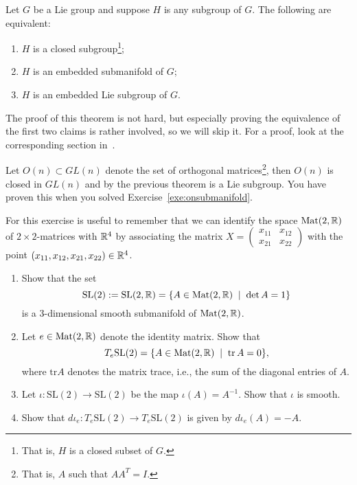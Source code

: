 \begin{theorem}
  Let $G$ be a Lie group and suppose $H$ is any subgroup of $G$.
  The following are equivalent:
  \begin{enumerate}
    \item $H$ is a closed subgroup\footnote{That is, $H$ is a closed subset of $G$.};
    \item $H$ is an embedded submanifold of $G$;
    \item $H$ is an embedded Lie subgroup of $G$.
  \end{enumerate}
\end{theorem}

The proof of this theorem is not hard, but especially proving the equivalence of the first two claims is rather involved, so we will skip it.
For a proof, look at the corresponding section in~\cite[Chapter 20]{book:lee}.

\begin{example}
  Let $O(n)\subset GL(n)$ denote the set of orthogonal matrices\footnote{That is, $A$ such that $AA^T = I$.}, then $O(n)$ is closed in $GL(n)$ and by the previous theorem is a Lie subgroup.
  You have proven this when you solved Exercise~\ref{exe:onsubmanifold}.
\end{example}

\begin{exercise}\label{ex:SL2LGA}
  For this exercise is useful to remember that we can identify the space $\mathrm{Mat}(2,\mathbb{R})$ of $2\times 2$-matrices with $\mathbb{R}^4$ by associating the matrix $X = \begin{pmatrix}x_{11} & x_{12}\\ x_{21} & x_{22}\end{pmatrix}$ with the point $(x_{11}, x_{12}, x_{21}, x_{22})\in\mathbb{R}^4$.
  
  \begin{enumerate}
    \item Show that the set
    \begin{equation*}
      \mathrm{SL}(2) := \mathrm{SL}(2,\mathbb{R}) = \{ A\in \mathrm{Mat}(2,\mathbb{R}) \;\mid\; \det A = 1 \}
    \end{equation*}
    is a 3-dimensional smooth submanifold of $\mathrm{Mat}(2,\mathbb{R})$.
    \item Let $e\in\mathrm{Mat}(2,\mathbb{R})$ denote the identity matrix. Show that
    \begin{equation*}
      T_e \mathrm{SL}(2) = \{ A\in \mathrm{Mat}(2,\mathbb{R}) \;\mid\; \mathrm{tr}\, A = 0 \},
    \end{equation*}
    where $\mathrm{tr} A$ denotes the matrix trace, i.e., the sum of the diagonal entries of $A$.
    \item Let $\iota: \mathrm{SL}(2)\to \mathrm{SL}(2)$ be the map $\iota(A) = A^{-1}$. Show that $\iota$ is smooth.
    \item Show that $d\iota_e: T_e\mathrm{SL}(2)\to T_e\mathrm{SL}(2)$ is given by $d\iota_e(A) = -A$.
  \end{enumerate}
\end{exercise}

